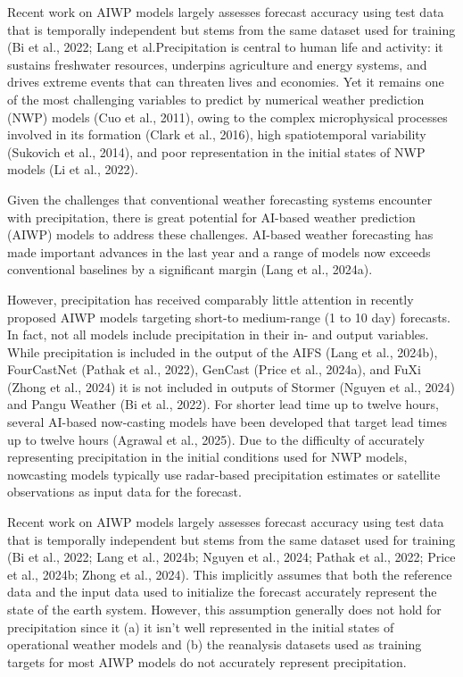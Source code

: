 \documentclass{ametsocV6.1}
\begin{document}
Recent work on AIWP models largely assesses forecast accuracy using test data
that is temporally independent but stems from the same dataset used for training
(Bi et al., 2022; Lang et al.Precipitation is central to human life and
activity: it sustains freshwater resources, underpins agriculture and energy
systems, and drives extreme events that can threaten lives and economies. Yet it
remains one of the most challenging variables to predict by numerical weather
prediction (NWP) models (Cuo et al., 2011), owing to the complex microphysical
processes involved in its formation (Clark et al., 2016), high spatiotemporal
variability (Sukovich et al., 2014), and poor representation in the initial
states of NWP models (Li et al., 2022).

Given the challenges that conventional weather forecasting systems encounter
with precipitation, there is great potential for AI-based weather prediction
(AIWP) models to address these challenges. AI-based weather forecasting has made
important advances in the last year and a range of models now exceeds
conventional baselines by a significant margin (Lang et al., 2024a).

However, precipitation has received comparably little attention in recently
proposed AIWP models targeting short-to medium-range (1 to 10 day) forecasts. In
fact, not all models include precipitation in their in- and output variables.
While precipitation is included in the output of the AIFS (Lang et al., 2024b),
FourCastNet (Pathak et al., 2022), GenCast (Price et al., 2024a), and FuXi
(Zhong et al., 2024) it is not included in outputs of Stormer (Nguyen et al.,
2024) and Pangu Weather (Bi et al., 2022). For shorter lead time up to twelve
hours, several AI-based now-casting models have been developed that target lead
times up to twelve hours (Agrawal et al., 2025). Due to the difficulty of
accurately representing precipitation in the initial conditions used for NWP
models, nowcasting models typically use radar-based precipitation estimates or
satellite observations as input data for the forecast.

Recent work on AIWP models largely assesses forecast accuracy using test data
that is temporally independent but stems from the same dataset used for training
(Bi et al., 2022; Lang et al., 2024b; Nguyen et al., 2024; Pathak et al., 2022;
Price et al., 2024b; Zhong et al., 2024). This implicitly assumes that both the
reference data and the input data used to initialize the forecast accurately
represent the state of the earth system. However, this assumption generally does
not hold for precipitation since it (a) it isn’t well represented in the initial
states of operational weather models and (b) the reanalysis datasets used as
training targets for most AIWP models do not accurately represent precipitation.
\end{document}
